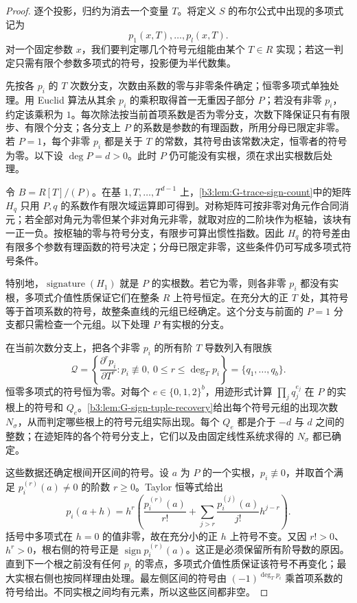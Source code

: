 \begin{proof}
	逐个投影，归约为消去一个变量 \(T\)。将定义 \(S\) 的布尔公式中出现的多项式记为
	\[
		p_1(x,T),\ldots,p_l(x,T).
	\]
	对一个固定参数 \(x\)，我们要判定哪几个符号元组能由某个 \(T\in R\) 实现；若这一判定只需有限个参数多项式的符号，投影便为半代数集。

	先按各 \(p_i\) 的 \(T\) 次数分支，次数由系数的零与非零条件确定；恒零多项式单独处理。用 Euclid 算法从其余 \(p_i\) 的乘积取得首一无重因子部分 \(P\)；若没有非零 \(p_i\)，约定该乘积为 \(1\)。每次除法按当前首项系数是否为零分支，次数下降保证只有有限步、有限个分支；各分支上 \(P\) 的系数是参数的有理函数，所用分母已限定非零。若 \(P=1\)，每个非零 \(p_i\) 都是关于 \(T\) 的常数，其符号由该常数决定，恒零者的符号为零。以下设 \(\deg P=d>0\)。此时 \(P\) 仍可能没有实根，须在求出实根数后处理。

	令 \(B=R[T]/(P)\)。在基 \(1,T,\ldots,T^{d-1}\) 上，\cref{b3:lem:G-trace-sign-count}中的矩阵 \(H_q\) 只用 \(P,q\) 的系数作有限次域运算即可得到。对称矩阵可按非零对角元作合同消元；若全部对角元为零但某个非对角元非零，就取对应的二阶块作为枢轴，该块有一正一负。按枢轴的零与符号分支，有限步可算出惯性指数。因此 \(H_q\) 的符号差由有限多个参数有理函数的符号决定；分母已限定非零，这些条件仍可写成多项式符号条件。

	特别地，\(\operatorname{signature}(H_1)\) 就是 \(P\) 的实根数。若它为零，则各非零 \(p_i\) 都没有实根，多项式介值性质保证它们在整条 \(R\) 上符号恒定。在充分大的正 \(T\) 处，其符号等于首项系数的符号，故整条直线的元组已经确定。这个分支与前面的 \(P=1\) 分支都只需检查一个元组。以下处理 \(P\) 有实根的分支。

	在当前次数分支上，把各个非零 \(p_i\) 的所有阶 \(T\) 导数列入有限族
	\[
		\mathcal Q=\left\{\frac{\partial^r p_i}{\partial T^r}: p_i\not\equiv0,\ 0\le r\le\deg_Tp_i\right\} =\{q_1,\ldots,q_b\}.
	\]
	恒零多项式的符号恒为零。对每个 \(e\in\{0,1,2\}^b\)，用迹形式计算 \(\prod_jq_j^{e_j}\) 在 \(P\) 的实根上的符号和 \(Q_e\)。\cref{b3:lem:G-sign-tuple-recovery}给出每个符号元组的出现次数 \(N_\sigma\)，从而判定哪些根上的符号元组实际出现。每个 \(Q_e\) 都是介于 \(-d\) 与 \(d\) 之间的整数；在迹矩阵的各个符号分支上，它们以及由固定线性系统求得的 \(N_\sigma\) 都已确定。

	这些数据还确定根间开区间的符号。设 \(a\) 为 \(P\) 的一个实根，\(p_i\not\equiv0\)，并取首个满足 \(p_i^{(r)}(a)\ne0\) 的阶数 \(r\ge0\)。Taylor 恒等式给出
	\[
		p_i(a+h)=h^r\left(\frac{p_i^{(r)}(a)}{r!} +\sum_{j>r}\frac{p_i^{(j)}(a)}{j!}h^{j-r}\right).
	\]
	括号中多项式在 \(h=0\) 的值非零，故在充分小的正 \(h\) 上符号不变。又因 \(r!>0\)、\(h^r>0\)，根右侧的符号正是 \(\operatorname{sign}p_i^{(r)}(a)\)。这正是必须保留所有阶导数的原因。直到下一个根之前没有任何 \(p_i\) 的零点，多项式介值性质保证该符号不再变化；最大实根右侧也按同样理由处理。最左侧区间的符号由 \((-1)^{\deg_Tp_i}\) 乘首项系数的符号给出。不同实根之间均有元素，所以这些区间都非空。


\end{proof}
